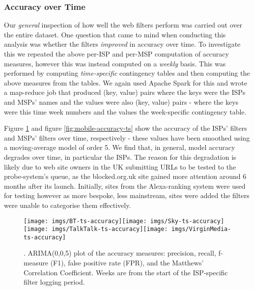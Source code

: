 \documentclass{bmcart}
\begin{document}


\subsubsection*{Accuracy over Time}
Our \textit{general} inspection of how well the web filters perform was carried out over the entire dataset.
One question that came to mind when conducting this analysis was whether the filters \textit{improved} in accuracy over time.
To investigate this we repeated the above per-ISP and per-MSP computation of accuracy measures, however this was instead computed on a \textit{weekly} basis.
This was performed by computing \textit{time-specific} contingency tables and then computing the above measures from the tables.
We again used Apache Spark for this and wrote a map-reduce job that produced (key, value) pairs where the keys were the ISPs and MSPs' names and the values were also (key, value) pairs - where the keys were this time week numbers and the values the week-specific contingency table.

Figure \ref{fig:broadband-accuracy-ts} and figure \ref{fig:mobile-accuracy-ts} show the accuracy of the ISPs' filters and MSPs' filters over time, respectively - these values have been smoothed using a moving-average model of order 5.
We find that, in general, model accuracy degrades over time, in particular the ISPs.
The reason for this degradation is likely due to web site owners in the UK submitting URLs to be tested to the probe-system's queue, as the blocked.org.uk site gained more attention around 6 months after its launch.
Initially, sites from the Alexa-ranking system were used for testing however as more bespoke, less mainstream, sites were added the filters were unable to categorise them effectively.

\begin{figure}[h!]
\caption{. ARIMA(0,0,5) plot of the accuracy measures: precision, recall, f-measure (F1), false positive rate (FPR), and the Matthews' Correlation Coefficient. Weeks are from the start of the ISP-specific filter logging period.}
\texttt{[image: imgs/BT-ts-accuracy]}\texttt{[image: imgs/Sky-ts-accuracy]}
\texttt{[image: imgs/TalkTalk-ts-accuracy]}\texttt{[image: imgs/VirginMedia-ts-accuracy]}
\label{fig:broadband-accuracy-ts}
\end{figure}
\end{document}
